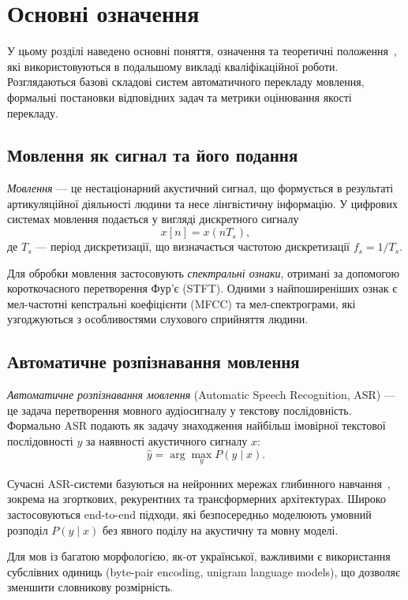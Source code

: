 \section{Основні означення}

У цьому розділі наведено основні поняття, означення та теоретичні
положення~\cite{jurafsky}, які використовуються в подальшому викладі
кваліфікаційної роботи. Розглядаються
базові складові систем автоматичного перекладу мовлення, формальні постановки
відповідних задач та метрики оцінювання якості перекладу.

\subsection{Мовлення як сигнал та його подання}

\textit{Мовлення} --- це нестаціонарний акустичний сигнал, що формується в результаті
артикуляційної діяльності людини та несе лінгвістичну інформацію. У цифрових
системах мовлення подається у вигляді дискретного сигналу
\[
x[n] = x(nT_s),
\]
де $T_s$ --- період дискретизації, що визначається частотою дискретизації
$f_s = 1/T_s$.

Для обробки мовлення застосовують \textit{спектральні ознаки}, отримані за допомогою
короткочасного перетворення Фур'є (STFT). Одними з найпоширеніших ознак є
мел-частотні кепстральні коефіцієнти (MFCC) та мел-спектрограми, які
узгоджуються з особливостями слухового сприйняття людини.

\subsection{Автоматичне розпізнавання мовлення}
\label{subsec:asr}

\textit{Автоматичне розпізнавання мовлення} (Automatic Speech Recognition, ASR) ---
це задача перетворення мовного аудіосигналу у текстову послідовність. Формально
ASR подають як задачу знаходження найбільш імовірної текстової послідовності
$y$ за наявності акустичного сигналу $x$:
\[
\hat{y} = \arg\max_{y} P(y \mid x).
\]

Сучасні ASR-системи базуються на нейронних мережах глибинного
навчання~\cite{asr_survey,goodfellow_dl}, зокрема на згорткових,
рекурентних та трансформерних архітектурах. Широко
застосовуються end-to-end підходи, які безпосередньо моделюють умовний розподіл
$P(y \mid x)$ без явного поділу на акустичну та мовну моделі.

Для мов із багатою морфологією, як-от української, важливими є використання
субслівних одиниць (byte-pair encoding, unigram language models), що дозволяє
зменшити словникову розмірність.


